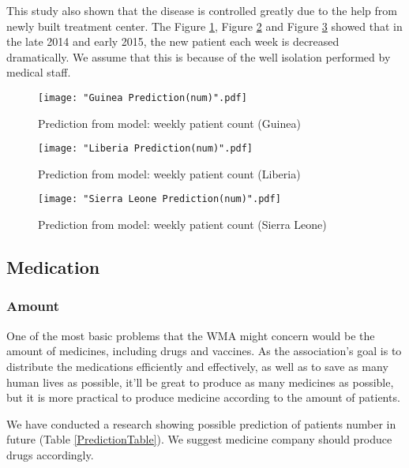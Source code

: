 \documentclass[12pt]{article}
\begin{document}

This study also shown that the disease is controlled greatly due to the help from newly built treatment center. The Figure \ref{GuineaPrediction2}, Figure \ref{LiberiaPrediction2} and Figure \ref{SierraLeonePrediction2} showed that in the late 2014 and early 2015, the new patient each week is decreased dramatically. We assume that this is because of the well isolation performed by medical staff.

\begin{figure}[htbp]
\centerline{\texttt{[image: "Guinea Prediction(num)".pdf]}}
\caption{Prediction from model: weekly patient count (Guinea)}
\label{GuineaPrediction2}
\end{figure}

\begin{figure}[htbp]
\centerline{\texttt{[image: "Liberia Prediction(num)".pdf]}}
\caption{Prediction from model: weekly patient count (Liberia)}
\label{LiberiaPrediction2}
\end{figure}

\begin{figure}[htbp]
\centerline{\texttt{[image: "Sierra Leone Prediction(num)".pdf]}}
\caption{Prediction from model: weekly patient count (Sierra Leone)}
\label{SierraLeonePrediction2}
\end{figure}


\subsection{Medication}

\subsubsection{Amount}

One of the most basic problems that the WMA might concern would be the amount of medicines, including drugs and vaccines. As the association's goal is to distribute the medications efficiently and effectively, as well as to save as many human lives as possible, it'll be great to produce as many medicines as possible, but it is more practical to produce medicine according to the amount of patients. 

We have conducted a research showing possible prediction of patients number in future (Table \ref{PredictionTable}). We suggest medicine company should produce drugs accordingly.
\end{document}
